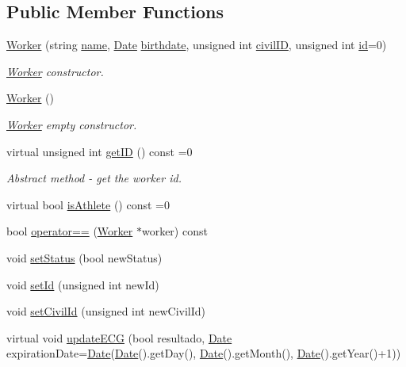 \subsection*{Public Member Functions}
\begin{DoxyCompactItemize}
\item 
\hyperlink{class_worker_a29731c51f83b66fad738b7c66383b62b}{Worker} (string \hyperlink{class_worker_a66cf57341253a31e418cf8abad59ffb1}{name}, \hyperlink{class_date}{Date} \hyperlink{class_worker_a3c1845f40a084b471750a787a87614dd}{birthdate}, unsigned int \hyperlink{class_worker_adfafba55f967994f4595bd914bbba127}{civil\+ID}, unsigned int \hyperlink{class_worker_afc39287cd510977cfe7697ed2c86b2ca}{id}=0)
\begin{DoxyCompactList}\small\item\em \hyperlink{class_worker}{Worker} constructor. \end{DoxyCompactList}\item 
\hyperlink{class_worker_a3754817df06ffe220f7f0d903c78ccac}{Worker} ()
\begin{DoxyCompactList}\small\item\em \hyperlink{class_worker}{Worker} empty constructor. \end{DoxyCompactList}\item 
virtual unsigned int \hyperlink{class_worker_a8b3e221c4a1ebd12ade03ee9b9c86182}{get\+ID} () const =0
\begin{DoxyCompactList}\small\item\em Abstract method -\/ get the worker id. \end{DoxyCompactList}\item 
virtual bool \hyperlink{class_worker_a0a2eb7505b3a734184be3dfdf3316cc3}{is\+Athlete} () const =0
\item 
bool \hyperlink{class_worker_ab2f8a86824ea129ea4d39b6ed7cfe847}{operator==} (\hyperlink{class_worker}{Worker} $\ast$worker) const
\item 
void \hyperlink{class_worker_a7d66047c0683a9a43f89254d0450cd47}{set\+Status} (bool new\+Status)
\item 
void \hyperlink{class_worker_a213180d9f1e4822113f654f7f4ed147c}{set\+Id} (unsigned int new\+Id)
\item 
void \hyperlink{class_worker_ace180f14f1a72e3e018c5ce06c1f3bb3}{set\+Civil\+Id} (unsigned int new\+Civil\+Id)
\item 
virtual void \hyperlink{class_worker_a7d06c15a1d9872d629988aa054996627}{update\+E\+CG} (bool resultado, \hyperlink{class_date}{Date} expiration\+Date=\hyperlink{class_date}{Date}(\hyperlink{class_date}{Date}().get\+Day(), \hyperlink{class_date}{Date}().get\+Month(), \hyperlink{class_date}{Date}().get\+Year()+1))

\end{DoxyCompactItemize}
